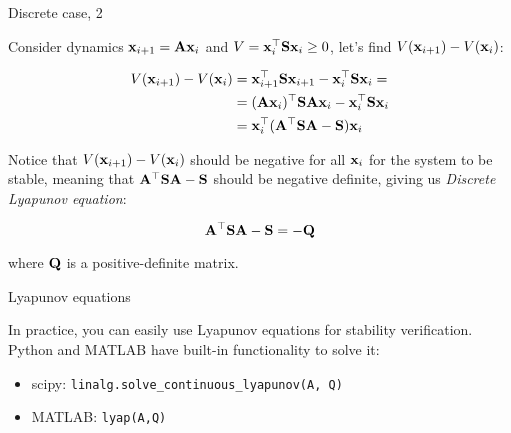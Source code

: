 \documentclass{beamer}
\begin{document}
\begin{frame}{Discrete case, 2}
\begin{flushleft}

Consider dynamics $\mathbf{x}_{i+1} = \mathbf{A}\mathbf{x}_i$ and $V = \mathbf{x}_i^\top\mathbf{S}\mathbf{x}_i \geq 0$, let's find $V(\mathbf{x}_{i+1}) - V(\mathbf{x}_i)$:

\begin{align}
	V(\mathbf{x}_{i+1}) - V(\mathbf{x}_i) &= \mathbf{x}_{i+1}^\top\mathbf{S}\mathbf{x}_{i+1}- 
	\mathbf{x}_i^\top\mathbf{S}\mathbf{x}_i =
	\\
	&= (\mathbf{A}\mathbf{x}_i)^\top\mathbf{S}\mathbf{A}\mathbf{x}_i - 
	\mathbf{x}_i^\top\mathbf{S}\mathbf{x}_i
	\\
	&= \mathbf{x}_i^\top(\mathbf{A}^\top\mathbf{S}\mathbf{A} - \mathbf{S})\mathbf{x}_i
\end{align}

Notice that $V(\mathbf{x}_{i+1}) - V(\mathbf{x}_i)$ should be negative for all $\mathbf{x}_i$ for the system to be stable, meaning that $\mathbf{A}^\top\mathbf{S}\mathbf{A} - \mathbf{S}$ should be negative definite, giving us \emph{Discrete Lyapunov equation}:

\begin{equation}
    \mathbf{A}^\top\mathbf{S}\mathbf{A} - \mathbf{S} = -\mathbf{Q}
\end{equation}

where $\mathbf{Q}$ is a positive-definite matrix.

\end{flushleft}
\end{frame}






\begin{frame}{Lyapunov equations}
\begin{flushleft}

In practice, you can easily use Lyapunov equations for stability verification. Python and MATLAB have built-in functionality to solve it:

\begin{itemize}
    \item scipy: \texttt{linalg.solve\_continuous\_lyapunov(A, Q)}
    \item MATLAB: \texttt{lyap(A,Q)}
\end{itemize}

\end{flushleft}
\end{frame}
\end{document}
